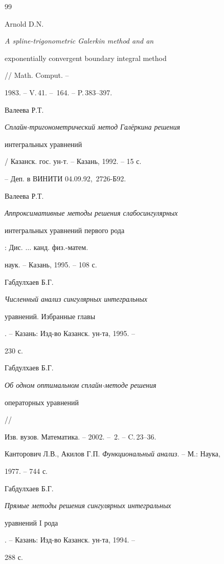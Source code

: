  


 


\begin{thebibliography}{99} 


 




Arnold D.N. {\em A spline-trigonometric Galerkin method and an 


exponentially convergent boundary integral method} // Math. Comput. -- 


1983. -- V.\,41. -- \No\,164. -- P.\,383--397. 




Валеева Р.Т. {\em Сплайн-тригонометрический метод Гал\"еркина решения 


интегральных уравнений} / Казанск. гос. ун-т. -- Казань, 1992. -- 15 с. 


-- Деп. в ВИНИТИ 04.09.92, \No\,2726-Б92. 




Валеева Р.Т. {\em Аппроксимативные методы решения слабосингулярных 


интегральных уравнений первого рода}: Дис. $\dotsc$ канд. физ.-матем. 


наук. -- Казань, 1995. -- 108 с. 




Габдулхаев Б.Г. {\em Численный анализ сингулярных интегральных 


уравнений. Избранные главы}. -- Казань: Изд-во Казанск. ун-та, 1995. -- 


230 с. 




Габдулхаев Б.Г. {\em Об одном оптимальном сплайн-методе решения


операторных уравнений} // 


Изв. вузов. Математика. -- 2002. -- \No\,2. -- C.\,23--36.




Канторович Л.В., Акилов Г.П. {\em Функциональный анализ}. -- М.: Наука, 


1977. -- 744 с. 




Габдулхаев Б.Г. {\em Прямые методы решения сингулярных интегральных 


уравнений $\mathrm I$ рода}. -- Казань: Изд-во Казанск. ун-та, 1994. -- 


288 с. 





\end{thebibliography}
